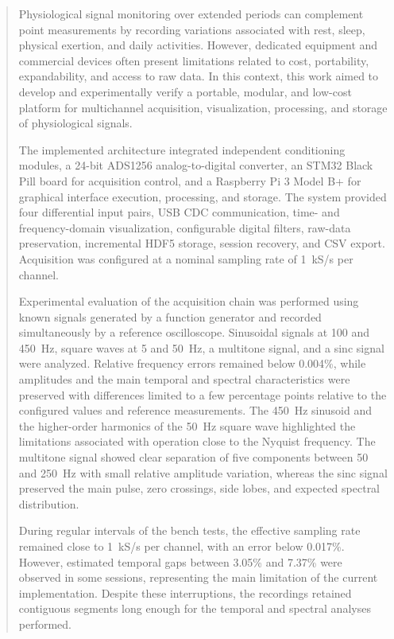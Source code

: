 \documentclass[a4paper,12pt]{fcte}
\begin{document}
\begin{abstract}

Physiological signal monitoring over extended periods can complement point measurements by recording variations associated with rest, sleep, physical exertion, and daily activities. However, dedicated equipment and commercial devices often present limitations related to cost, portability, expandability, and access to raw data. In this context, this work aimed to develop and experimentally verify a portable, modular, and low-cost platform for multichannel acquisition, visualization, processing, and storage of physiological signals.

The implemented architecture integrated independent conditioning modules, a 24-bit ADS1256 analog-to-digital converter, an STM32 Black Pill board for acquisition control, and a Raspberry Pi 3 Model B+ for graphical interface execution, processing, and storage. The system provided four differential input pairs, USB CDC communication, time- and frequency-domain visualization, configurable digital filters, raw-data preservation, incremental HDF5 storage, session recovery, and CSV export. Acquisition was configured at a nominal sampling rate of 1~kS/s per channel.

Experimental evaluation of the acquisition chain was performed using known signals generated by a function generator and recorded simultaneously by a reference oscilloscope. Sinusoidal signals at 100 and 450~Hz, square waves at 5 and 50~Hz, a multitone signal, and a sinc signal were analyzed. Relative frequency errors remained below 0.004\%, while amplitudes and the main temporal and spectral characteristics were preserved with differences limited to a few percentage points relative to the configured values and reference measurements. The 450~Hz sinusoid and the higher-order harmonics of the 50~Hz square wave highlighted the limitations associated with operation close to the Nyquist frequency. The multitone signal showed clear separation of five components between 50 and 250~Hz with small relative amplitude variation, whereas the sinc signal preserved the main pulse, zero crossings, side lobes, and expected spectral distribution.

During regular intervals of the bench tests, the effective sampling rate remained close to 1~kS/s per channel, with an error below 0.017\%. However, estimated temporal gaps between 3.05\% and 7.37\% were observed in some sessions, representing the main limitation of the current implementation. Despite these interruptions, the recordings retained contiguous segments long enough for the temporal and spectral analyses performed.


\end{abstract}
\end{document}
